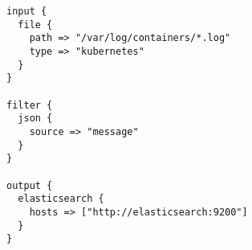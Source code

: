   \begin{verbatim}
input {
  file {
    path => "/var/log/containers/*.log"
    type => "kubernetes"
  }
}

filter {
  json {
    source => "message"
  }
}

output {
  elasticsearch {
    hosts => ["http://elasticsearch:9200"]
  }
}
  \end{verbatim}